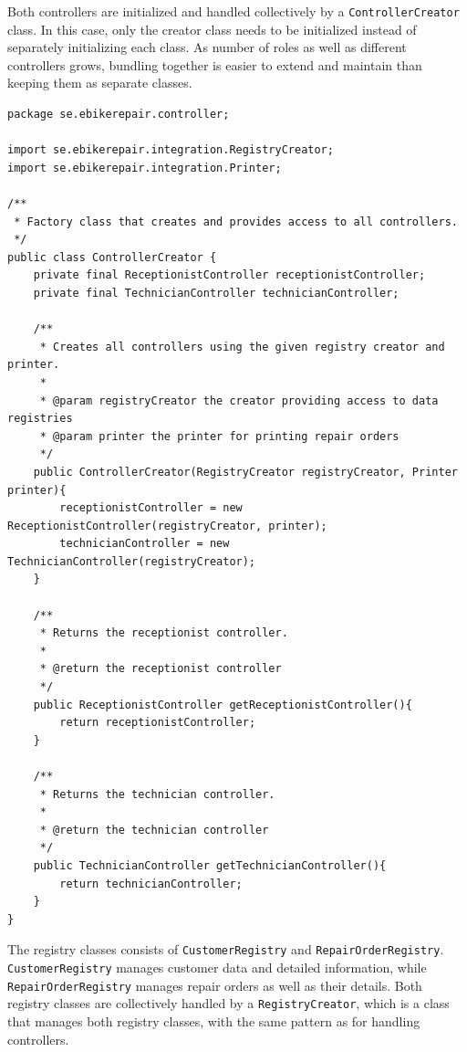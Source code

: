 \documentclass[a4paper]{scrartcl}
\begin{document}
Both controllers are initialized and handled collectively by a \texttt{ControllerCreator} class. In this case, only the creator class needs to be initialized instead of separately initializing each class. As number of roles as well as different controllers grows, bundling together is easier to extend and maintain than keeping them as separate classes.

\begin{lstlisting}[style=javastyle, caption={Main class entry point}]
package se.ebikerepair.controller;

import se.ebikerepair.integration.RegistryCreator;
import se.ebikerepair.integration.Printer;

/**
 * Factory class that creates and provides access to all controllers.
 */
public class ControllerCreator {
    private final ReceptionistController receptionistController;
    private final TechnicianController technicianController;

    /**
     * Creates all controllers using the given registry creator and printer.
     *
     * @param registryCreator the creator providing access to data registries
     * @param printer the printer for printing repair orders
     */
    public ControllerCreator(RegistryCreator registryCreator, Printer printer){
        receptionistController = new ReceptionistController(registryCreator, printer);
        technicianController = new TechnicianController(registryCreator);
    }

    /**
     * Returns the receptionist controller.
     *
     * @return the receptionist controller
     */
    public ReceptionistController getReceptionistController(){
        return receptionistController;
    }

    /**
     * Returns the technician controller.
     *
     * @return the technician controller
     */
    public TechnicianController getTechnicianController(){
        return technicianController;
    }
}
\end{lstlisting}

The registry classes consists of \texttt{CustomerRegistry} and \texttt{RepairOrderRegistry}. \texttt{CustomerRegistry} manages customer data and detailed information, while \texttt{RepairOrderRegistry} manages repair orders as well as their details. Both registry classes are collectively handled by a \texttt{RegistryCreator}, which is a class that manages both registry classes, with the same pattern as for handling controllers.
\end{document}
